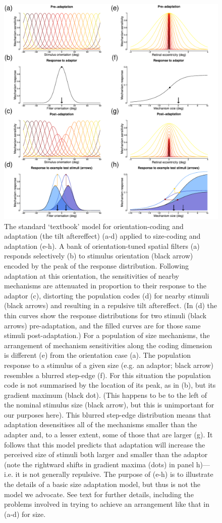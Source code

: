 \documentclass[
]{article}
\begin{document}
\begin{figure}

{\centering \includegraphics[width=0.8\linewidth]{Figures/Figure1} 

}

\caption{The standard ‘textbook’ model for orientation-coding and adaptation (the tilt aftereffect) (a-d) applied to size-coding and adaptation (e-h). A bank of orientation-tuned spatial filters (a) responds selectively (b) to stimulus orientation (black arrow) encoded by the peak of the response distribution. Following adaptation at this orientation, the sensitivities of nearby mechanisms are attenuated in proportion to their response to the adaptor (c), distorting the population codes (d) for nearby stimuli (black arrows) and resulting in a repulsive tilt aftereffect. (In (d) the thin curves show the response distributions for two stimuli (black arrows) pre-adaptation, and the filled curves are for those same stimuli post-adaptation.) For a population of size mechanisms, the arrangement of mechanism sensitivities along the coding dimension is different (e) from the orientation case (a). The population response to a stimulus of a given size (e.g. an adaptor; black arrow) resembles a blurred step-edge (f). For this situation the population code is not summarised by the location of its peak, as in (b), but its gradient maximum (black dot). (This happens to be to the left of the nominal stimulus size (black arrow), but this is unimportant for our purposes here). This blurred step-edge distribution means that adaptation desensitises all of the mechanisms smaller than the adapter and, to a lesser extent, some of those that are larger (g). It follows that this model predicts that adaptation will increase the perceived size of stimuli both larger and smaller than the adaptor (note the rightward shifts in gradient maxima (dots) in panel h)—i.e. it is not generally repulsive. The purpose of (e-h) is to illustrate the details of a basic size adaptation model, but thus is not the model we advocate. See text for further details, including the problems involved in trying to achieve an arrangement like that in (a-d) for size.}\label{fig:figure1}
\end{figure}
\end{document}
